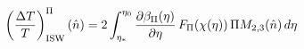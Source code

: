 

\[
\left(\frac{\Delta T}{T}\right)_{\rm ISW}^\Pi(\hat{n})
= 2\int_{\eta_*}^{\eta_0}
\frac{\partial\beta_\Pi(\eta)}{\partial\eta}\,
F_\Pi(\chi(\eta))\,
\Pi M_{2,3}(\hat{n})\,d\eta
\]



